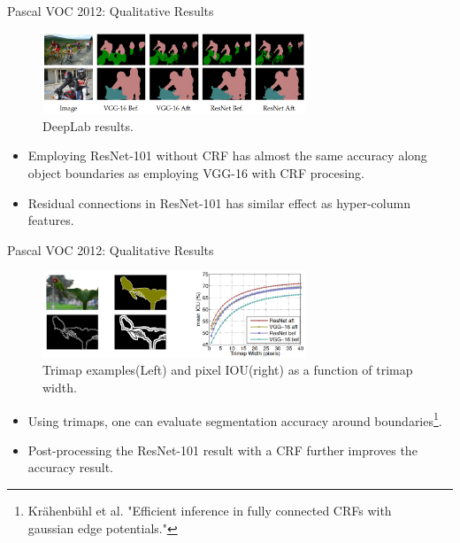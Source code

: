 \documentclass{beamer}
\begin{document}
\begin{frame}{Pascal VOC 2012: Qualitative Results}	
\begin{figure}
	\centering
	\includegraphics[width=0.70\textwidth]{figure/ss41.png}
	\captionsetup{justification=centering}
	\caption{DeepLab results.}
	\label{fig:M2}
\end{figure}
\vspace{-0.4cm}
\begin{itemize}
	\item Employing ResNet-101 without CRF has almost the same accuracy along object boundaries as employing VGG-16 with CRF procesing.
	\item Residual connections in ResNet-101 has similar effect as hyper-column features.
\end{itemize}
\end{frame}

\begin{frame}{Pascal VOC 2012: Qualitative Results}	
\begin{figure}
	\centering
	\includegraphics[width=0.70\textwidth]{figure/ss46.png}
	\captionsetup{justification=centering}
	\caption{Trimap examples(Left) and pixel IOU(right) as a function of trimap width.}
\end{figure}
\vspace{-0.4cm}
\begin{itemize}
	\item Using trimaps, one can evaluate segmentation accuracy around boundaries\footnote{Krähenbühl et al. "Efficient inference in fully connected CRFs with\\ gaussian edge potentials."}.
	\item Post-processing the ResNet-101 result with a CRF further improves the accuracy result.
\end{itemize}
\end{frame}
\end{document}
